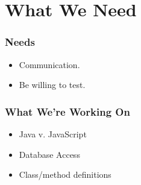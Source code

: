 \documentclass{beamer}
\begin{document}
\section{What We Need}
\begin{frame}[Needs]
	\frametitle{Needs}
	\begin{itemize}[<+->]
		\item Communication.
		\item Be willing to test.
	\end{itemize}
\end{frame}


\begin{frame}
\frametitle{What We're Working On}
\begin{itemize}[<+->]
	\item Java v. JavaScript
	\item Database Access
	\item Class/method definitions
\end{itemize}
\end{frame}
\end{document}
